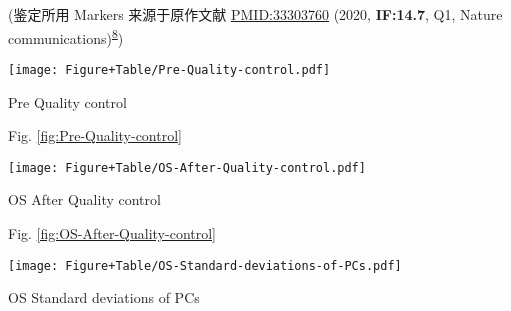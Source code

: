 \documentclass[
]{article}
\begin{document}
(鉴定所用 Markers 来源于原作文献 \url{PMID:33303760} (2020, \textbf{IF:14.7}, Q1, Nature communications)\textsuperscript{\protect\hyperlink{ref-Single_cell_RNA_Zhou_2020}{8}})

\begin{center}\vspace{1.5cm}\end{center}
\def\@captype{figure}
\begin{center}
\texttt{[image: Figure+Table/Pre-Quality-control.pdf]}
\caption{Pre Quality control}\label{fig:Pre-Quality-control}
\end{center}

\begin{center}\vspace{1.5cm}\end{center}

Fig. \ref{fig:Pre-Quality-control}

\begin{center}\vspace{1.5cm}\end{center}
\def\@captype{figure}
\begin{center}
\texttt{[image: Figure+Table/OS-After-Quality-control.pdf]}
\caption{OS After Quality control}\label{fig:OS-After-Quality-control}
\end{center}

\begin{center}\vspace{1.5cm}\end{center}

Fig. \ref{fig:OS-After-Quality-control}

\begin{center}\vspace{1.5cm}\end{center}
\def\@captype{figure}
\begin{center}
\texttt{[image: Figure+Table/OS-Standard-deviations-of-PCs.pdf]}
\caption{OS Standard deviations of PCs}\label{fig:OS-Standard-deviations-of-PCs}
\end{center}

\begin{center}\vspace{1.5cm}\end{center}
\end{document}

